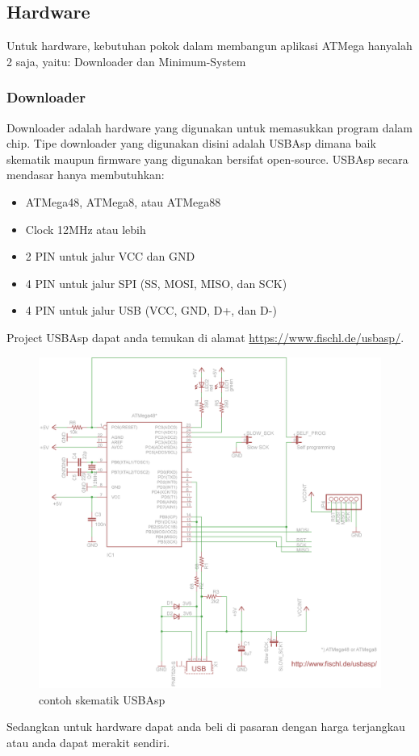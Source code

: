 \documentclass[12pt,]{article}
\begin{document}
	\subsection{Hardware}
	
	Untuk hardware, kebutuhan pokok dalam membangun aplikasi ATMega hanyalah 2 saja, yaitu: Downloader dan Minimum-System 
	
	\subsubsection{Downloader}
	Downloader adalah hardware yang digunakan untuk memasukkan program dalam chip.
	Tipe downloader yang digunakan disini adalah USBAsp dimana baik skematik maupun firmware yang digunakan bersifat open-source.
	USBAsp secara mendasar hanya membutuhkan:
	\begin{itemize}
		\item ATMega48, ATMega8, atau ATMega88
		\item Clock 12MHz atau lebih
		\item 2 PIN untuk jalur VCC dan GND
		\item 4 PIN untuk jalur SPI (SS, MOSI, MISO, dan SCK)
		\item 4 PIN untuk jalur USB (VCC, GND, D+, dan D-)
	\end{itemize}
	Project USBAsp dapat anda temukan di alamat \url{https://www.fischl.de/usbasp/}.
	
	\begin{figure}[H]
		\centering
		\includegraphics[width=0.6\linewidth]{images/usbasp}
		\caption{contoh skematik USBAsp}
	\end{figure}

	Sedangkan untuk hardware dapat anda beli di pasaran dengan harga terjangkau atau anda dapat merakit sendiri.
	
\end{document}
